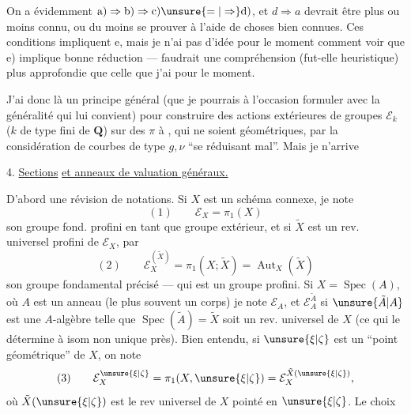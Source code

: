 
On a évidemment $\mathrm{a)}\Rightarrow\mathrm{b)}\Rightarrow\mathrm{c)}\unsure{=|\Rightarrow}\mathrm{d)}$, et $d\Rightarrow a$ devrait être plus ou moins connu, ou du moins se prouver à l'aide de choses bien connues. Ces conditions impliquent e, mais je n'ai pas d'idée pour le moment comment voir que e) implique bonne réduction --- faudrait une compréhension (fut-elle heuristique) plus approfondie que celle que j'ai pour le moment.

J'ai donc là un principe général (que je pourrais à l'occasion formuler avec la généralité qui lui convient) pour construire des actions extérieures  de groupes $\mathcal E_k$ ($k$  de type fini de $\mathbf Q$) sur des $\pi$ à , qui  ne soient géométriques, par  la considération de courbes de type $g,\nu$ ``se réduisant mal''. Mais je n'arrive

4. \uline{Sections}  \uline{et anneaux de valuation généraux.}

D'abord une révision de notations. Si $X$ est un schéma connexe, je note 
\[
(1)\qquad \mathcal E_X=\pi_1(X)
\]
son groupe fond. profini en tant que groupe extérieur, et si $\tilde X$ est un rev. universel profini de $\mathcal E_X$, par
\[
(2)\qquad \mathcal E_X^{(\tilde X)}=\pi_1(X;\tilde X)=\operatorname{Aut}_X(\tilde X)
\]
son groupe fondamental précisé --- qui est un groupe profini. Si $X=\operatorname{Spec}(A)$, où $A$ est un anneau (le plus souvent un corps) je note $\mathcal E_A$, et $\mathcal E_A^{\tilde A}$  si $\unsure{\tilde A|A}$ est une $A$-algèbre telle que $\operatorname{Spec}(\tilde A)=\tilde X$ soit un rev. universel de $X$ (ce qui le détermine à isom non unique près). Bien entendu, si $\unsure{\xi|\zeta}$ est un ``point géométrique'' de $X$, on note
\[
(3)\qquad \mathcal E_X^{\unsure{\xi|\zeta}}=\pi_1(X,\unsure{\xi|\zeta})=\mathcal E_X^{\tilde X(\unsure{\xi|\zeta})},
\]
où $\tilde X(\unsure{\xi|\zeta})$ est le rev universel de $X$ pointé en $\unsure{\xi|\zeta}$. Le choix


